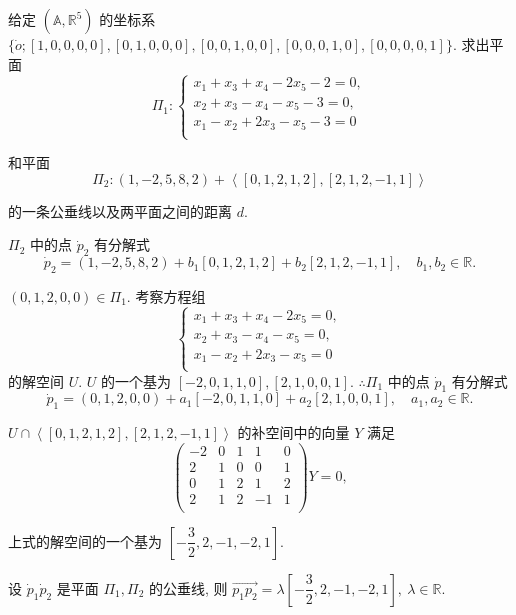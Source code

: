 \documentclass{ctexart}
\begin{document}
\begin{exercise}%
    给定 $(\mathbb{A},\mathbb{R}^5)$ 的坐标系 $\{\dot{o};[1,0,0,0,0],[0,1,0,0,0],[0,0,1,0,0],[0,0,0,1,0],[0,0,0,0,1]\}$. 求出平面
    \[\varPi_1:\begin{cases}
        x_1+x_3+x_4-2x_5-2=0, \\
        x_2+x_3-x_4-x_5-3=0, \\
        x_1-x_2+2x_3-x_5-3=0 \\
    \end{cases}\]

    和平面
    \[\varPi_2:(1,-2,5,8,2)+\left<[0,1,2,1,2],[2,1,2,-1,1]\right>\]

    的一条公垂线以及两平面之间的距离 $d$.
\end{exercise}
\begin{solution}
    $\varPi_2$ 中的点 $\dot{p}_2$ 有分解式
    \[\dot{p}_2=(1,-2,5,8,2)+b_1[0,1,2,1,2]+b_2[2,1,2,-1,1],\quad b_1,b_2\in\mathbb{R}.\]

    $(0,1,2,0,0)\in\varPi_1$. 考察方程组
    \[\begin{cases}
        x_1+x_3+x_4-2x_5=0, \\
        x_2+x_3-x_4-x_5=0, \\
        x_1-x_2+2x_3-x_5=0 \\
    \end{cases}\]
    的解空间 $U$. $U$ 的一个基为 $[-2,0,1,1,0],[2,1,0,0,1]$. $\therefore\varPi_1$ 中的点 $\dot{p}_1$ 有分解式
    \[\dot{p}_1=(0,1,2,0,0)+a_1[-2,0,1,1,0]+a_2[2,1,0,0,1],\quad a_1,a_2\in\mathbb{R}.\]

    $U\cap\left<[0,1,2,1,2],[2,1,2,-1,1]\right>$ 的补空间中的向量 $Y$ 满足
    \[\begin{pmatrix}
        -2 & 0 & 1 & 1 & 0 \\
        2 & 1 & 0 & 0 & 1 \\
        0 & 1 & 2 & 1 & 2 \\
        2 & 1 & 2 & -1 & 1 \\
    \end{pmatrix}Y=0,\]

    上式的解空间的一个基为 $\left[-\dfrac{3}{2},2,-1,-2,1\right]$.

    设 $\dot{p}_1\dot{p}_2$ 是平面 $\varPi_1,\varPi_2$ 的公垂线, 则 $\overrightarrow{p_1p_2}=\lambda\left[-\dfrac{3}{2},2,-1,-2,1\right],\ \lambda\in\mathbb{R}$.


\end{solution}
\end{document}
